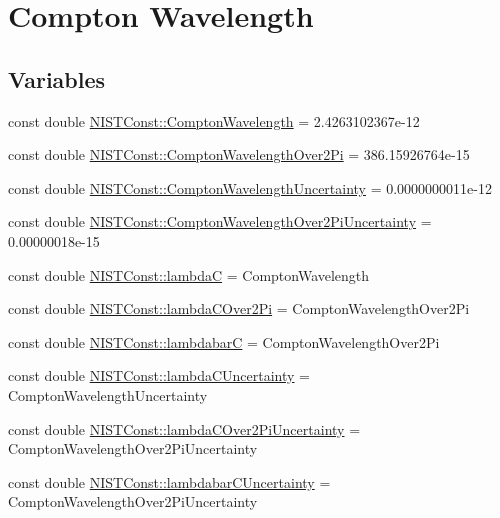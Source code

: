 \hypertarget{group___compton_wavelength}{}\section{Compton Wavelength}
\label{group___compton_wavelength}
\subsection*{Variables}
\begin{DoxyCompactItemize}
\item 
const double \hyperlink{group___compton_wavelength_ga6f9b597d657bd3e9add13a76516cbabc}{N\+I\+S\+T\+Const\+::\+Compton\+Wavelength} = 2.\+4263102367e-\/12
\item 
const double \hyperlink{group___compton_wavelength_ga5031f85750fecb545f0353cb05bb7c69}{N\+I\+S\+T\+Const\+::\+Compton\+Wavelength\+Over2\+Pi} = 386.\+15926764e-\/15
\item 
const double \hyperlink{group___compton_wavelength_ga4845f956ea0bf6f4eaf7396173b09430}{N\+I\+S\+T\+Const\+::\+Compton\+Wavelength\+Uncertainty} = 0.\+0000000011e-\/12
\item 
const double \hyperlink{group___compton_wavelength_ga900f59720b26696c75d2ce455d686a57}{N\+I\+S\+T\+Const\+::\+Compton\+Wavelength\+Over2\+Pi\+Uncertainty} = 0.\+00000018e-\/15
\item 
const double \hyperlink{group___compton_wavelength_gae311e27b1f359b90efb6895ddf388a80}{N\+I\+S\+T\+Const\+::lambdaC} = Compton\+Wavelength
\item 
const double \hyperlink{group___compton_wavelength_gadaf3906a9db23eece3ac4e130978a8ce}{N\+I\+S\+T\+Const\+::lambda\+C\+Over2\+Pi} = Compton\+Wavelength\+Over2\+Pi
\item 
const double \hyperlink{group___compton_wavelength_gaeed48ca7330a4ba9227043237fed90f9}{N\+I\+S\+T\+Const\+::lambdabarC} = Compton\+Wavelength\+Over2\+Pi
\item 
const double \hyperlink{group___compton_wavelength_ga5de8d927be86c65e9e7d78f2c399cc49}{N\+I\+S\+T\+Const\+::lambda\+C\+Uncertainty} = Compton\+Wavelength\+Uncertainty
\item 
const double \hyperlink{group___compton_wavelength_ga6e5779d1afe643df1e5c28e97cfaf957}{N\+I\+S\+T\+Const\+::lambda\+C\+Over2\+Pi\+Uncertainty} = Compton\+Wavelength\+Over2\+Pi\+Uncertainty
\item 
const double \hyperlink{group___compton_wavelength_ga56b8e49aa3ccbfb73a500f63c9fd3b05}{N\+I\+S\+T\+Const\+::lambdabar\+C\+Uncertainty} = Compton\+Wavelength\+Over2\+Pi\+Uncertainty
\end{DoxyCompactItemize}


